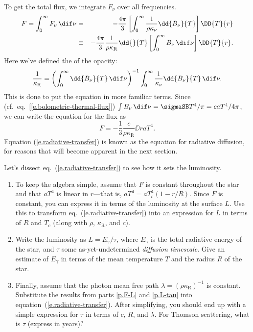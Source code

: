 To get the total flux, we integrate $F_{\nu}$ over all frequencies. 
\begin{eqnarray*}
	F = \int_{0}^{\infty}F_{\nu}\,\dif\nu &=& -\frac{4\pi}{3} \left[\int_{0}^{\infty} \frac{1}{\rho\kappa_{\nu}}\dd{B_{\nu}}{T}\right]\DD{T}{r}\\
	&\equiv& -\frac{4\pi}{3}\frac{1}{\rho\kappa_{\mathrm{R}}}\dd{}{T}\left[\int_{0}^{\infty}B_{\nu}\,\dif\nu\right]\DD{T}{r}.
\end{eqnarray*}
Here we've defined the  of the opacity:
\begin{equation}\label{e.rosseland-opacity}
	\frac{1}{\kappa_{\mathrm{R}}} = \left(\int_{0}^{\infty} \dd{B_{\nu}}{T}\,\dif\nu\right)^{-1}\int_{0}^{\infty} \frac{1}{\kappa_{\nu}}\dd{B_{\nu}}{T}\,\dif\nu.
\end{equation}
This is done to put the equation in more familiar terms. Since (cf.\ eq.~[\ref{e.bolometric-thermal-flux}]) $\int B_{\nu}\,\dif\nu = \sigmaSB T^{4}/\pi = c a T^{4}/4\pi$, we can write the equation for the flux as
\begin{equation}
	F = -\frac{1}{3}\frac{c}{\rho\kappa_{\mathrm{R}}}\DD{}{r}aT^{4}.
\label{e.radiative-transfer}
\end{equation}
Equation (\ref{e.radiative-transfer}) is known as the equation for radiative diffusion, for reasons that will become apparent in the next section.

\begin{exercisebox}
\label{ex.radiative-transfer-diffusion}
Let's dissect eq.~(\ref{e.radiative-transfer}) to see how it sets the luminosity.  
\begin{enumerate}
\item\label{p.F-L}
To keep the algebra simple, assume that $F$ is constant throughout the star and that $aT^{4}$ is linear in $r$---that is, $aT^{4} = aT_{c}^{4}(1-r/R)$.  Since $F$ is constant, you can express it in terms of the luminosity at the surface $L$.  Use this to transform eq.~(\ref{e.radiative-transfer}) into an expression for $L$ in terms of $R$ and $T_{c}$ (along with $\rho$, $\kappa_{\mathrm{R}}$, and $c$).

\item\label{p.L-tau}
Write the luminosity as $L = E_{\gamma}/\tau$, where $E_{\gamma}$ is the total radiative energy of the star, and $\tau$ some as-yet-undetermined \emph{diffusion timescale}.  Give an estimate of $E_{\gamma}$ in terms of the mean temperature $T$ and the radius $R$ of the star.

\item\label{p.tau}
Finally, assume that the photon mean free path $\lambda = (\rho\kappa_{\mathrm{R}})^{-1}$ is constant.  Substitute the results from parts \ref{p.F-L} and \ref{p.L-tau} into equation~(\ref{e.radiative-transfer}).  After simplifying, you should end up with a simple expression for $\tau$ in terms of $c$, $R$, and $\lambda$.  For Thomson scattering, what is $\tau$ (express in years)?
\end{enumerate}
\end{exercisebox}

